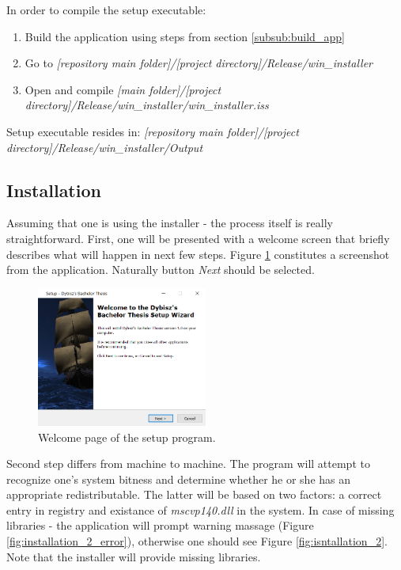 \documentclass{report}
\begin{document}
In order to compile the setup executable:
\begin{enumerate}
\item Build the application using steps from section \ref{subsub:build_app}
\item Go to  \textit{[repository main folder]/[project directory]/Release/win\_installer}
\item Open and compile \textit{[main folder]/[project directory]/Release/win\_installer/win\_installer.iss} 
\end{enumerate}


Setup executable resides in:  \textit{[repository main folder]/[project directory]/Release/win\_installer/Output} 

\subsection{Installation} \label{sub:using_setup}
Assuming that one is using the installer - the process itself is really straightforward. First, one will be presented with a welcome screen that briefly describes what will happen in next few steps. Figure \ref{fig:installation_1} constitutes a screenshot from the application. Naturally button \textit{Next} should be selected. 
\begin{figure}[H] 
    \centering
    \includegraphics[width=0.5\textwidth]{images/installation_1.png}
    \caption{Welcome page of the setup program.}
    \label{fig:installation_1}
\end{figure}

Second step differs from machine to machine. The program will attempt to recognize one's system bitness and determine whether he or she has an appropriate redistributable. The latter will be based on two factors: a correct entry in registry and existance of \textit{mscvp140.dll} in the system. In case of missing libraries - the application will prompt warning massage (Figure  \ref{fig:installation_2_error}), otherwise one should see Figure \ref{fig:isntallation_2}. Note that the installer will provide missing libraries.
\end{document}
